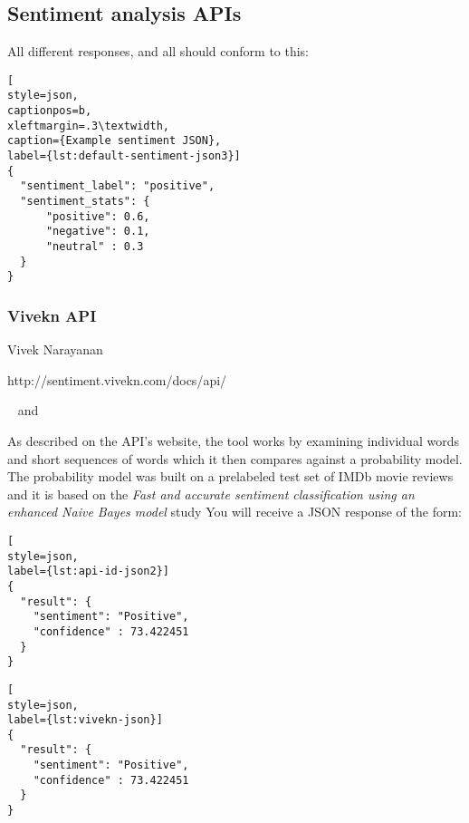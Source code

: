 \subsection{Sentiment analysis APIs\label{sec:apis}}
All different responses, and all should conform to this:
\begin{lstlisting}[
style=json,
captionpos=b,
xleftmargin=.3\textwidth,
caption={Example sentiment JSON},
label={lst:default-sentiment-json3}]
{
  "sentiment_label": "positive",
  "sentiment_stats": {
      "positive": 0.6,
      "negative": 0.1,
      "neutral" : 0.3
  }
}
\end{lstlisting}

\subsubsection*{Vivekn API}

\begin{description}
\singlespacing
 \item[Author:] Vivek Narayanan
 \item[Web url:] http://sentiment.vivekn.com/docs/api/
 \item[Database columns:]  and 
\end{description}
As described on the API's website, the tool works by examining individual words and short sequences of words which it then compares against a probability model. The probability model was built on a prelabeled test set of IMDb movie reviews
and it is based on the \emph{Fast and accurate sentiment classification using an enhanced Naive Bayes model} study \cite{DBLP:journals/corr/abs-1305-6143}
You will receive a JSON response of the form:


\newsavebox\vivekresponse
\newsavebox\apiidd

\begin{lrbox}{\apiidd}
\begin{lstlisting}[
style=json,
label={lst:api-id-json2}]
{ 
  "result": { 
    "sentiment": "Positive", 
    "confidence" : 73.422451 
  } 
}
\end{lstlisting}
\end{lrbox}


\begin{lrbox}{\vivekresponse}
\begin{lstlisting}[
style=json,
label={lst:vivekn-json}]
{ 
  "result": { 
    "sentiment": "Positive", 
    "confidence" : 73.422451 
  } 
}
\end{lstlisting}
\end{lrbox}


